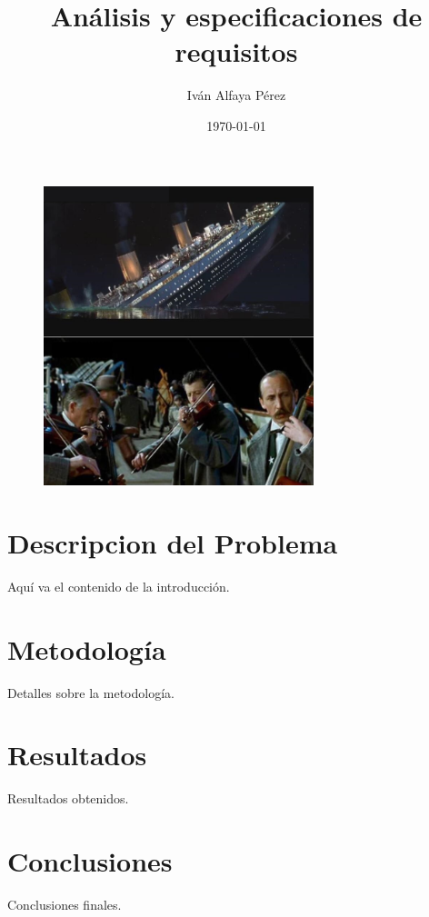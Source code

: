 \documentclass{article}
\title{Análisis y especificaciones de requisitos}
\author{Iván Alfaya Pérez}
\date{\today}
\begin{document}
\maketitle

\begin{figure}[h!]
    \centering
    \includegraphics[width=0.7\textwidth]{img1.jpg}
\end{figure}

\clearpage 

\tableofcontents %
\clearpage 

\section{Descripcion del Problema}
Aquí va el contenido de la introducción.

\section{Metodología}
Detalles sobre la metodología.


\section{Resultados}
Resultados obtenidos.

\section{Conclusiones}
Conclusiones finales.
\end{document}

